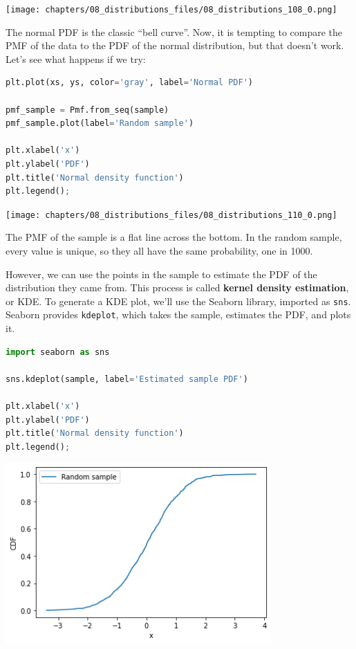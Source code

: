 \begin{center}
\texttt{[image: chapters/08\_distributions\_files/08\_distributions\_108\_0.png]}
\end{center}

The normal PDF is the classic ``bell curve''. Now, it is tempting to
compare the PMF of the data to the PDF of the normal distribution, but
that doesn't work. Let's see what happens if we try:

\begin{lstlisting}[language=Python,style=source]
plt.plot(xs, ys, color='gray', label='Normal PDF')

pmf_sample = Pmf.from_seq(sample)
pmf_sample.plot(label='Random sample')

plt.xlabel('x')
plt.ylabel('PDF')
plt.title('Normal density function')
plt.legend();
\end{lstlisting}

\begin{center}
\texttt{[image: chapters/08\_distributions\_files/08\_distributions\_110\_0.png]}
\end{center}

The PMF of the sample is a flat line across the bottom. In the random
sample, every value is unique, so they all have the same probability,
one in 1000.

However, we can use the points in the sample to estimate the PDF of the
distribution they came from. This process is called \textbf{kernel
density estimation}, or KDE. To generate a KDE plot, we'll use the
Seaborn library, imported as \passthrough{\lstinline!sns!}. Seaborn
provides \passthrough{\lstinline!kdeplot!}, which takes the sample,
estimates the PDF, and plots it.

\begin{lstlisting}[language=Python,style=source]
import seaborn as sns

sns.kdeplot(sample, label='Estimated sample PDF')

plt.xlabel('x')
plt.ylabel('PDF')
plt.title('Normal density function')
plt.legend();
\end{lstlisting}

\begin{center}
\includegraphics[width=4in]{chapters/08_distributions_files/08_distributions_112_0.png}
\end{center}

